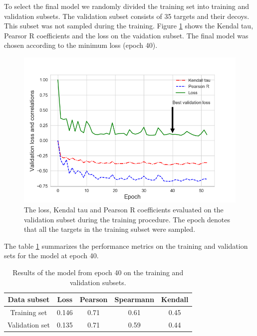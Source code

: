 To select the final model we randomly divided the training set into training and validation subsets. The validation subset consists of 
35 targets and their decoys. This subset was not sampled during the training. 
Figure \ref{Fig:TrainingLoss} shows the Kendal tau, Pearsor R coefficients and the loss on the vaidation subset. 
The final model was chosen according to the minimum loss (epoch 40).
\begin{figure}[H]
    \centering
    \includegraphics[width=\linewidth]{Fig/kendall_validation.png}
    \caption{The loss, Kendal tau and Pearson R coefficients evaluated on the validation subset during the training procedure. The epoch 
    denotes that all the targets in the training subset were sampled.}
    \label{Fig:TrainingLoss}
\end{figure}

The table \ref{Tbl:TrainingResults} summarizes the performance metrics on the training and validation sets for the model at epoch 40.

\begin{table}[H]
\begin{center}
\begin{tabular}{ c | c | c | c | c }
    Data subset & Loss & Pearson & Spearmann & Kendall \\
    \hline
    Training set     &0.146 &0.71 &0.61 &0.45 \\
    Validation set   &0.135 &0.71 &0.59 &0.44 \\ \hline

\end{tabular}
  \caption {Results of the model from epoch 40 on the training and validation subsets.}
    \label{Tbl:TrainingResults}
\end{center}
\end{table}